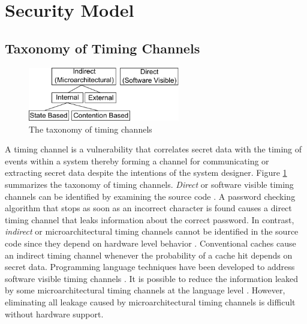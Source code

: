 \section{Security Model}
\subsection{Taxonomy of Timing Channels}
    \begin{figure}
        \begin{center}
            \includegraphics[width=2.6in]{figs/taxonomy.pdf}
            \caption{The taxonomy of timing channels}
            \label{fig:taxonomy}
        \end{center}
    \end{figure}

A timing channel is a vulnerability that correlates secret data with the  
timing of events within a system thereby forming a channel for communicating or 
extracting secret data despite the intentions of the system designer. Figure 
\ref{fig:taxonomy} summarizes the taxonomy of timing channels. \emph{Direct} or 
software visible timing channels can be identified by examining the source code 
\cite{mitigation3}. A password checking algorithm that stops as soon as an 
incorrect character is found causes a direct timing channel that leaks 
information about the correct password. In contrast, \emph{indirect} or 
microarchitectural timing channels cannot be identified in the source code 
since they depend on hardware level behavior \cite{mitigation3}. Conventional 
caches cause an indirect timing channel whenever the probability of a cache hit 
depends on secret data. Programming language techniques have been developed to 
address software visible timing channels 
\cite{timesens,mitigation1,mitigation2,mitigation3}. It is possible to reduce 
the information leaked by some microarchitectural timing channels at the 
language level \cite{mitigation3}. However, eliminating all leakage caused by 
microarchitectural timing channels is difficult without hardware support.

